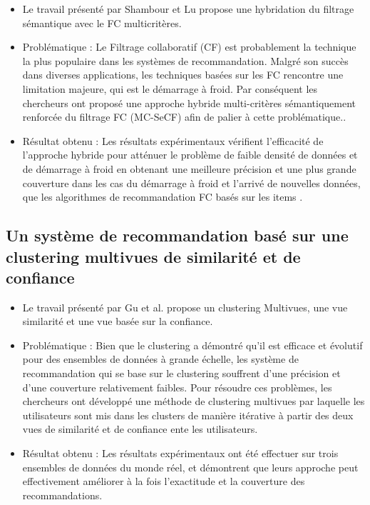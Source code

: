 \documentclass[a4paper,12pt,letterpaper,headsepline,singlespacing,headsepline, french]{report}
\begin{document}
\begin{itemize}	
\item Le travail présenté par Shambour et Lu \cite {ref36} propose une hybridation du filtrage sémantique avec le FC multicritères.


\item 	Problématique :  Le Filtrage collaboratif (CF) est probablement la technique la plus populaire dans les systèmes de recommandation. Malgré son succès dans diverses applications, les techniques basées sur les FC rencontre une limitation majeure, qui est le démarrage à froid. Par conséquent les chercheurs ont proposé une approche hybride multi-critères sémantiquement renforcée du filtrage FC (MC-SeCF) afin de palier à cette problématique.\cite {ref36}. 

\item 	Résultat obtenu : Les résultats expérimentaux vérifient l’efficacité de l’approche hybride pour atténuer le problème de faible densité de données et de démarrage à froid en obtenant une meilleure précision et une plus grande couverture dans les cas du démarrage à froid et l’arrivé de nouvelles données, que les algorithmes de recommandation FC basés sur les items \cite {ref36}. 
\end{itemize}

\subsection{Un système de recommandation basé sur une clustering multivues de similarité et de confiance}
\begin{itemize}	
\item Le travail présenté par Gu et al. \cite{ref30} propose un clustering Multivues, une vue similarité et une vue basée sur la confiance.

\item 	Problématique : Bien que le clustering a démontré qu’il est efficace et évolutif pour des ensembles de données à grande échelle, les système de recommandation qui se base sur le clustering souffrent d'une précision et d'une couverture relativement faibles. Pour résoudre ces problèmes, les chercheurs ont développé une méthode de clustering multivues  par laquelle les utilisateurs sont mis dans les clusters de manière itérative à partir des deux vues de similarité et de confiance ente les utilisateurs\cite{ref30}.

\item	Résultat obtenu : Les résultats expérimentaux ont été effectuer sur trois ensembles de données du monde réel, et démontrent que leurs approche peut effectivement améliorer à la fois l'exactitude et la couverture des recommandations\cite{ref30}.
\end{itemize}
	
\end{document}
